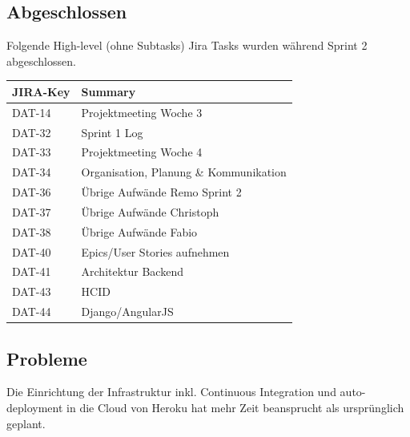 \subsection{Abgeschlossen}
Folgende High-level (ohne Subtasks) Jira Tasks wurden während Sprint 2 abgeschlossen.

\begin{table}[H]
\centering
\begin{tabular}{ll}
	\toprule
	\textbf{JIRA-Key} & \textbf{Summary}\\
	\midrule
		DAT-14 & Projektmeeting Woche 3\\
		DAT-32 & Sprint 1 Log\\
		DAT-33 & Projektmeeting Woche 4\\
		DAT-34 & Organisation, Planung \& Kommunikation\\
		DAT-36 & Übrige Aufwände Remo Sprint 2\\
		DAT-37 & Übrige Aufwände Christoph\\
		DAT-38 & Übrige Aufwände Fabio\\
		DAT-40 & Epics/User Stories aufnehmen\\
		DAT-41 & Architektur Backend\\
		DAT-43 & HCID\\
		DAT-44 & Django/AngularJS\\
	\bottomrule
\end{tabular}	
\end{table}

\subsection{Probleme}
Die Einrichtung der Infrastruktur inkl. Continuous Integration und auto-deployment in die Cloud von Heroku hat mehr Zeit beansprucht als ursprünglich geplant.